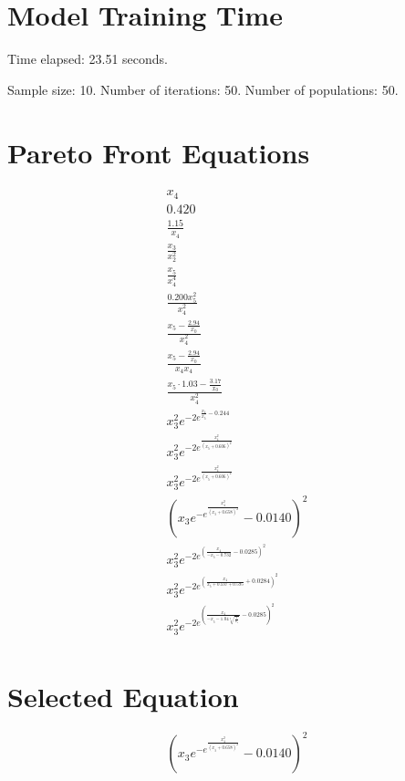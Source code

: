\documentclass{article}
\begin{document}
\section*{Model Training Time}
Time elapsed: 23.51 seconds.

Sample size: 10.
Number of iterations: 50.
Number of populations: 50.

\section*{Pareto Front Equations}
\begin{align*}
x_{4} \\
0.420 \\
\frac{1.15}{x_{4}} \\
\frac{x_{3}}{x_{2}^{2}} \\
\frac{x_{5}}{x_{4}^{4}} \\
\frac{0.200 x_{5}^{2}}{x_{4}^{2}} \\
\frac{x_{5} - \frac{2.94}{x_{0}}}{x_{4}^{2}} \\
\frac{x_{5} - \frac{2.94}{x_{0}}}{x_{4} x_{4}} \\
\frac{x_{5} \cdot 1.03 - \frac{3.17}{x_{0}}}{x_{4}^{2}} \\
x_{3}^{2} e^{- 2 e^{\frac{x_{4}}{x_{5}} - 0.244}} \\
x_{3}^{2} e^{- 2 e^{\frac{x_{4}^{2}}{\left(x_{5} + 0.606\right)^{2}}}} \\
x_{3}^{2} e^{- 2 e^{\frac{x_{4}^{2}}{\left(x_{5} + 0.606\right)^{2}}}} \\
\left(x_{3} e^{- e^{\frac{x_{4}^{2}}{\left(x_{5} + 0.658\right)^{2}}}} - 0.0140\right)^{2} \\
x_{3}^{2} e^{- 2 e^{\left(\frac{x_{4}}{- x_{5} - 0.732} - 0.0285\right)^{2}}} \\
x_{3}^{2} e^{- 2 e^{\left(\frac{x_{4}}{x_{5} + 0.137 + 0.595} + 0.0284\right)^{2}}} \\
x_{3}^{2} e^{- 2 e^{\left(\frac{x_{4}}{- x_{5} - 1.04 \sqrt[4]{\frac{1}{x_{1}}}} - 0.0285\right)^{2}}} \\
\end{align*}

\section*{Selected Equation}
\[ \left(x_{3} e^{- e^{\frac{x_{4}^{2}}{\left(x_{5} + 0.658\right)^{2}}}} - 0.0140\right)^{2} \]
\end{document}
